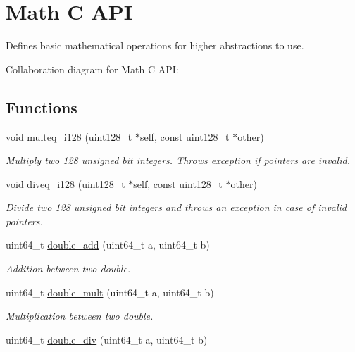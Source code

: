 \hypertarget{group__mathcapi}{}\section{Math C A\+PI}
\label{group__mathcapi}


Defines basic mathematical operations for higher abstractions to use.  


Collaboration diagram for Math C A\+PI\+:
\subsection*{Functions}
\begin{DoxyCompactItemize}
\item 
void \mbox{\hyperlink{group__mathcapi_ga61d571f58c24fb4663cc3729f3d5613e}{multeq\+\_\+i128}} (uint128\+\_\+t $\ast$self, const uint128\+\_\+t $\ast$\mbox{\hyperlink{structother}{other}})
\begin{DoxyCompactList}\small\item\em Multiply two 128 unsigned bit integers. \mbox{\hyperlink{struct_throws}{Throws}} exception if pointers are invalid. \end{DoxyCompactList}\item 
void \mbox{\hyperlink{group__mathcapi_gad70a23703654281749410aef05c85c74}{diveq\+\_\+i128}} (uint128\+\_\+t $\ast$self, const uint128\+\_\+t $\ast$\mbox{\hyperlink{structother}{other}})
\begin{DoxyCompactList}\small\item\em Divide two 128 unsigned bit integers and throws an exception in case of invalid pointers. \end{DoxyCompactList}\item 
uint64\+\_\+t \mbox{\hyperlink{group__mathcapi_ga7372b74e4cb87455342d39bdf3724811}{double\+\_\+add}} (uint64\+\_\+t a, uint64\+\_\+t b)
\begin{DoxyCompactList}\small\item\em Addition between two double. \end{DoxyCompactList}\item 
uint64\+\_\+t \mbox{\hyperlink{group__mathcapi_ga6390d36d23bd89bcd9bcf52385ba88f2}{double\+\_\+mult}} (uint64\+\_\+t a, uint64\+\_\+t b)
\begin{DoxyCompactList}\small\item\em Multiplication between two double. \end{DoxyCompactList}\item 
uint64\+\_\+t \mbox{\hyperlink{group__mathcapi_gad67af06a6b0e9dbbf3be05d6bf99257c}{double\+\_\+div}} (uint64\+\_\+t a, uint64\+\_\+t b)

\end{DoxyCompactItemize}
